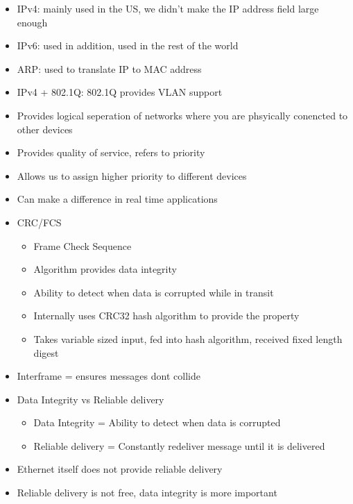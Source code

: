 \documentclass{article}
\begin{document}
\begin{itemize}
\begin{itemize}
\begin{itemize}
        \item IPv4: mainly used in the US, we didn't make the IP address field large enough 
        \item IPv6: used in addition, used in the rest of the world
        \item ARP: used to translate IP to MAC address
        \item IPv4 + 802.1Q: 802.1Q provides VLAN support 
        \item Provides logical seperation of networks where you are phsyically conencted to other devices
        \item Provides quality of service, refers to priority
        \item Allows us to assign higher priority to different devices
        \item Can make a difference in real time applications
        \item CRC/FCS 
        \begin{itemize}
            \item Frame Check Sequence
            \item Algorithm provides data integrity
            \item Ability to detect when data is corrupted while in transit
            \item Internally uses CRC32 hash algorithm to provide the property
            \item Takes variable sized input, fed into hash algorithm, received fixed length digest
        \end{itemize}
        \item Interframe = ensures messages dont collide
        \item Data Integrity vs Reliable delivery
        \begin{itemize}
            \item Data Integrity = Ability to detect when data is corrupted
            \item Reliable delivery = Constantly redeliver message until it is delivered
        \end{itemize}
        \item Ethernet itself does not provide reliable delivery
        \item Reliable delivery is not free, data integrity is more important
    \end{itemize}
    \end{itemize}
\end{itemize}
\end{document}
